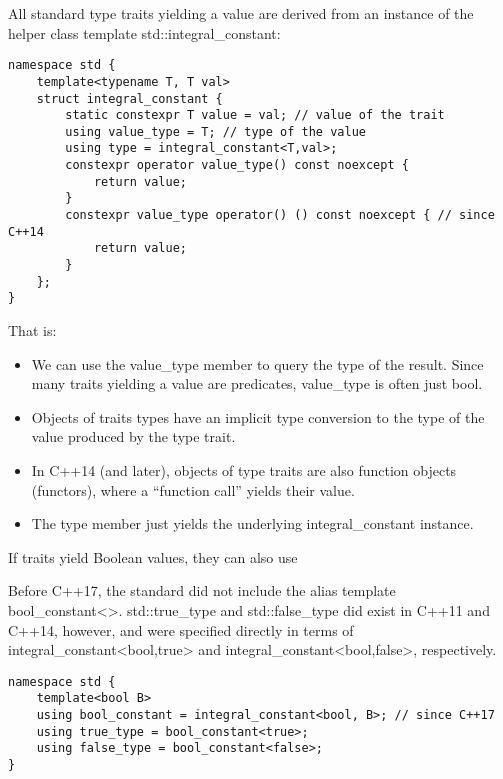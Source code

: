 All standard type traits yielding a value are derived from an instance of the helper class template std::integral\_constant:

\begin{lstlisting}[style=styleCXX]
namespace std {
	template<typename T, T val>
	struct integral_constant {
		static constexpr T value = val; // value of the trait
		using value_type = T; // type of the value
		using type = integral_constant<T,val>;
		constexpr operator value_type() const noexcept {
			return value;
		}
		constexpr value_type operator() () const noexcept { // since C++14
			return value;
		}
	};
}
\end{lstlisting}

That is:

\begin{itemize}
\item 
We can use the value\_type member to query the type of the result. Since many traits yielding a value are predicates, value\_type is often just bool.

\item 
Objects of traits types have an implicit type conversion to the type of the value produced by the type trait.

\item 
In C++14 (and later), objects of type traits are also function objects (functors), where a “function call” yields their value.

\item 
The type member just yields the underlying integral\_constant instance.
\end{itemize}

If traits yield Boolean values, they can also use

\begin{tcolorbox}[colback=webgreen!5!white,colframe=webgreen!75!black]
\hspace*{0.75cm}Before C++17, the standard did not include the alias template bool\_constant<>. std::true\_type and std::false\_type did exist in C++11 and C++14, however, and were specified directly in terms of integral\_constant<bool,true> and integral\_constant<bool,false>, respectively.
\end{tcolorbox}

\begin{lstlisting}[style=styleCXX]
namespace std {
	template<bool B>
	using bool_constant = integral_constant<bool, B>; // since C++17
	using true_type = bool_constant<true>;
	using false_type = bool_constant<false>;
}
\end{lstlisting}

